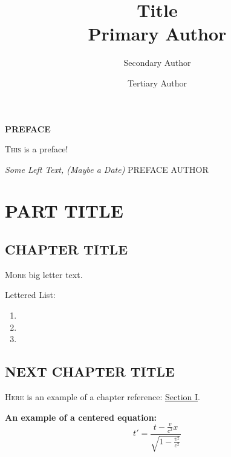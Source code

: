 \documentclass[titlepage]{book}
\title{\textbf{\huge{Title}\\\Large{Primary Author}}}
\author{
    Secondary Author
    \and
    Tertiary Author
}
\date{}
\newcommand{\secref}[1]{\hyperref[sec:#1]{Section #1}}
\newcommand{\firstword}[2]{
    \lettrine[lines=3,nindent=0em,findent=0.5em,realheight]{#1}{#2}
}
\newcommand{\letlist}[1]{
    \begin{enumerate}[label=(\emph{\alph*})]
        #1
    \end{enumerate}
}
\begin{document}

\maketitle


\begin{center}
    \textbf{\Large{PREFACE}}
\end{center}

\firstword{T}{his} is a preface! \lipsum[1]

\vspace{\baselineskip}

\textit{Some Left Text, (Maybe a Date)} \hfill PREFACE AUTHOR


\pagestyle{empty}
    \renewcommand{\baselinestretch}{0.94}\normalsize
            \tableofcontents
    \renewcommand{\baselinestretch}{1.0}\normalsize
\restoregeometry
\pagestyle{fancy}

\clearpage



\section{PART TITLE}

\subsection{CHAPTER TITLE} \label{sec:I}

\firstword{M}{ore} big letter text. \lipsum[5] 

Lettered List: 

\letlist{
    \item \lipsum[1]
    \item \lipsum[2-2]
    \item \lipsum[3-3]
}

\subsection{NEXT CHAPTER TITLE}

\firstword{H}{ere} is an example of a chapter reference: \secref{I}. \lipsum[1]

\lipsum[2-2] \textbf{An example of a centered equation:} \[
    t' = \frac{t - \frac{v}{c^2}x}{\sqrt{1 - \frac{v^2}{c^2}}}
\]
\end{document}

